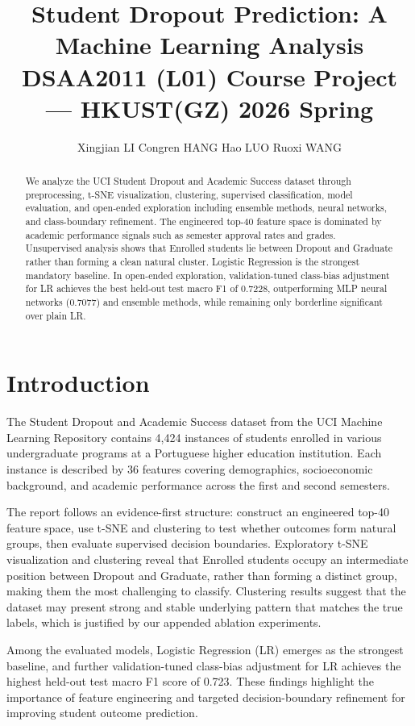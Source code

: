 \documentclass{article}
\title{Student Dropout Prediction: A Machine Learning Analysis\\
\large DSAA2011 (L01) Course Project --- HKUST(GZ) 2026 Spring}
\author{
  Xingjian LI \quad
  Congren HANG \quad
  Hao LUO \quad
  Ruoxi WANG
}
\begin{document}
\maketitle

\begin{abstract}
We analyze the UCI Student Dropout and Academic Success dataset through preprocessing, t-SNE visualization, clustering, supervised classification, model evaluation, and open-ended exploration including ensemble methods, neural networks, and class-boundary refinement. The engineered top-40 feature space is dominated by academic performance signals such as semester approval rates and grades. Unsupervised analysis shows that Enrolled students lie between Dropout and Graduate rather than forming a clean natural cluster. Logistic Regression is the strongest mandatory baseline. In open-ended exploration, validation-tuned class-bias adjustment for LR achieves the best held-out test macro F1 of 0.7228, outperforming MLP neural networks (0.7077) and ensemble methods, while remaining only borderline significant over plain LR.
\end{abstract}

\section{Introduction}

The Student Dropout and Academic Success dataset from the UCI Machine Learning Repository \cite{predict_students'_dropout_and_academic_success_697} contains 4,424 instances of students enrolled in various undergraduate programs at a Portuguese higher education institution. Each instance is described by 36 features covering demographics, socioeconomic background, and academic performance across the first and second semesters.

The report follows an evidence-first structure: construct an engineered top-40 feature space, use t-SNE and clustering to test whether outcomes form natural groups, then evaluate supervised decision boundaries. Exploratory t-SNE visualization and clustering reveal that Enrolled students occupy an intermediate position between Dropout and Graduate, rather than forming a distinct group, making them the most challenging to classify. Clustering results suggest that the dataset may present strong and stable underlying pattern that matches the true labels, which is justified by our appended ablation experiments.

Among the evaluated models, Logistic Regression (LR) emerges as the strongest baseline, and further validation-tuned class-bias adjustment for LR achieves the highest held-out test macro F1 score of 0.723. These findings highlight the importance of feature engineering and targeted decision-boundary refinement for improving student outcome prediction.
\end{document}
